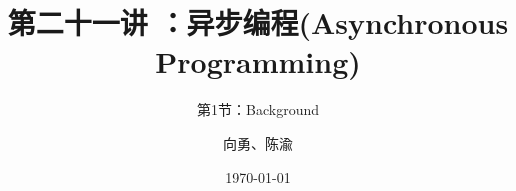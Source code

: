 


\title[第21讲]{第二十一讲 ：异步编程(Asynchronous Programming)} %
\subtitle{第1节：Background}
\author{向勇、陈渝} %
\date{\today} %



\begin{frame}
\titlepage %
\end{frame}


